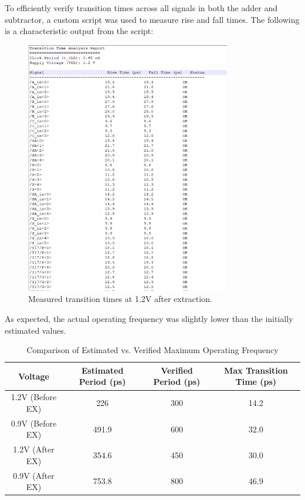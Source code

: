 \documentclass[a4paper,12pt]{article}
\begin{document}
To efficiently verify transition times across all signals in both the adder and subtractor, a custom script was used to measure rise and fall times. The following is a characteristic output from the script:
\begin{figure}[H]
    \centering
    \includegraphics[width=0.8\textwidth]{min_freq_af_ex_1.2/Transition_Times_0.45nS_1.2V.png}
    \caption{Measured transition times at 1.2V after extraction.}
\end{figure}

As expected, the actual operating frequency was slightly lower than the initially estimated values.

\begin{table}[H]
    \centering
    \begin{tabular}{|c|c|c|c|}
        \hline
        Voltage & Estimated Period (ps) & Verified Period (ps) & Max Transition Time (ps) \\
        \hline
 1.2V (Before EX) & 226 & 300 & 14.2 \\
        0.9V (Before EX) & 491.9 & 600 & 32.0 \\
        1.2V (After EX) & 354.6 & 450 & 30.0 \\
        0.9V (After EX) & 753.8 & 800 & 46.9 \\
        \hline
    \end{tabular}
    \caption{Comparison of Estimated vs. Verified Maximum Operating Frequency}
\end{table}
\end{document}
